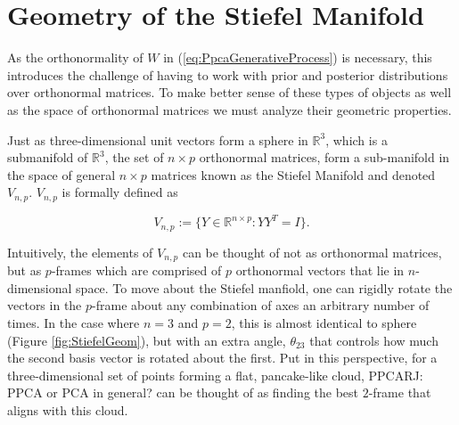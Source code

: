 \documentclass{article}
\newcommand{\commentRJ}[1]{{\textcolor{commentRJ_color}{RJ: #1}}}
\begin{document}

\section{Geometry of the Stiefel Manifold} \label{geometry}

As the orthonormality of $W$ in (\ref{eq:PpcaGenerativeProcess}) is necessary, this introduces the challenge of having to work with prior and posterior distributions over orthonormal matrices. To make better sense of these types of objects as well as the space of orthonormal matrices we must analyze their geometric properties.

Just as three-dimensional unit vectors form a sphere in $\mathbb{R}^3$, which is a submanifold of $\mathbb{R}^3$, the set of $n\times p$ orthonormal matrices, form a sub-manifold in the space of general $n \times p$ matrices known as the Stiefel Manifold and denoted $V_{n,p}$\citep{muirhead2009aspects}. $V_{n,p}$ is formally defined as

\begin{equation}
V_{n,p} := \{Y \in \mathbb{R}^{n \times p}: YY^T = I \}.
\end{equation}

Intuitively, the elements of $V_{n,p}$ can be thought of not as orthonormal matrices, but as $p$-frames which are comprised of $p$ orthonormal vectors that lie in $n$-dimensional space. To move about the Stiefel manfiold, one can rigidly rotate the vectors in the $p$-frame about any combination of axes an arbitrary number of times. In the case where $n = 3$ and $p = 2$, this is almost identical to sphere (Figure \ref{fig:StiefelGeom}), but with an extra angle, $\theta_{23}$ that controls how much the second basis vector is rotated about the first. Put in this perspective, for a three-dimensional set of points forming a flat, pancake-like cloud, PPCA\commentRJ{PPCA or PCA in general?} can be thought of as finding the best $2$-frame that aligns with this cloud.
\end{document}
